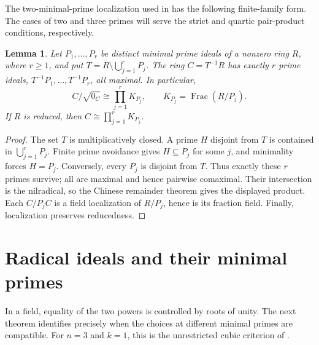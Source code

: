 \documentclass[11pt,a4paper]{amsart}
\newtheorem{lemma}[theorem]{Lemma}
\theoremstyle{definition}
\theoremstyle{remark}
\DeclareMathOperator{\Frac}{Frac}
\numberwithin{equation}{section}
\begin{document}
The two-minimal-prime localization used in
\cite[proof of Theorem~1]{YSO} has the following finite-family form.
The cases of two and three primes will serve the strict and quartic
pair-product conditions, respectively.

\begin{lemma}\label{lem:two-points}\label{quartic:finite-points}
Let $P_1,\ldots,P_r$ be distinct minimal prime ideals of a nonzero
ring $R$, where $r\ge1$, and put
$T=R\setminus\bigcup_{j=1}^rP_j$. The ring $C=T^{-1}R$ has
exactly $r$ prime ideals, $T^{-1}P_1,\ldots,T^{-1}P_r$, all maximal.
In particular,
\[
 C/\sqrt{0_C}\cong\prod_{j=1}^rK_{P_j},
 \qquad K_{P_j}=\Frac(R/P_j).
\]
If $R$ is reduced, then $C\cong\prod_{j=1}^rK_{P_j}$.
\end{lemma}
\begin{proof}
The set $T$ is multiplicatively closed. A prime $H$ disjoint from
$T$ is contained in $\bigcup_{j=1}^rP_j$. Finite prime avoidance
gives $H\subseteq P_j$ for some $j$, and minimality forces
$H=P_j$. Conversely, every $P_j$ is disjoint from $T$.
Thus exactly these $r$ primes survive; all are maximal and hence
pairwise comaximal. Their intersection is the nilradical, so the
Chinese remainder theorem gives the displayed product. Each
$C/P_jC$ is a field localization of $R/P_j$, hence is its fraction
field. Finally, localization preserves reducedness.
\end{proof}


\section{Radical ideals and their minimal primes}\label{sec:spectral}

In a field, equality of the two powers is controlled by roots of unity.
The next theorem identifies precisely when the choices at different
minimal primes are compatible. For $n=3$ and $k=1$, this is the
unrestricted cubic criterion of \cite[Theorem~1]{YSO}.
\end{document}
